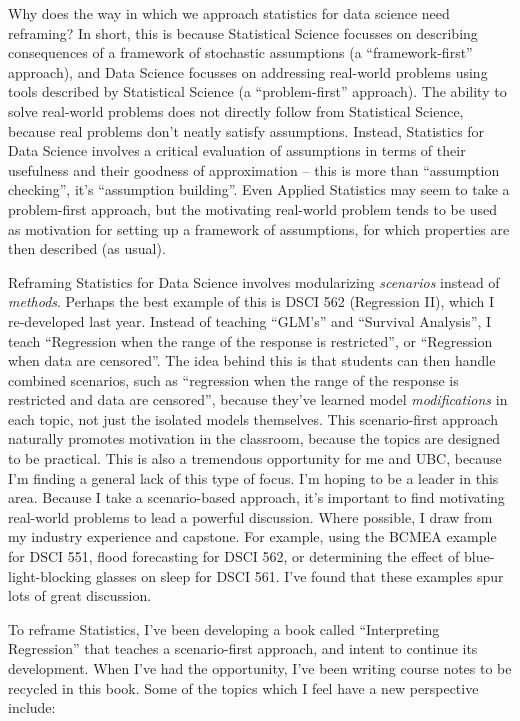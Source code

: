 \documentclass[]{article}
\begin{document}
Why does the way in which we approach statistics for data science need reframing? In short, this is because Statistical Science focusses on describing consequences of a framework of stochastic assumptions (a ``framework-first'' approach), and Data Science focusses on addressing real-world problems using tools described by Statistical Science (a ``problem-first'' approach). The ability to solve real-world problems does not directly follow from Statistical Science, because real problems don't neatly satisfy assumptions. Instead, Statistics for Data Science involves a critical evaluation of assumptions in terms of their usefulness and their goodness of approximation -- this is more than ``assumption checking'', it's ``assumption building''. Even Applied Statistics may seem to take a problem-first approach, but the motivating real-world problem tends to be used as motivation for setting up a framework of assumptions, for which properties are then described (as usual).

Reframing Statistics for Data Science involves modularizing \emph{scenarios} instead of \emph{methods}. Perhaps the best example of this is DSCI 562 (Regression II), which I re-developed last year. Instead of teaching ``GLM's'' and ``Survival Analysis'', I teach ``Regression when the range of the response is restricted'', or ``Regression when data are censored''. The idea behind this is that students can then handle combined scenarios, such as ``regression when the range of the response is restricted and data are censored'', because they've learned model \emph{modifications} in each topic, not just the isolated models themselves. This scenario-first approach naturally promotes motivation in the classroom, because the topics are designed to be practical. This is also a tremendous opportunity for me and UBC, because I'm finding a general lack of this type of focus. I'm hoping to be a leader in this area. Because I take a scenario-based approach, it's important to find motivating real-world problems to lead a powerful discussion. Where possible, I draw from my industry experience and capstone. For example, using the BCMEA example for DSCI 551, flood forecasting for DSCI 562, or determining the effect of blue-light-blocking glasses on sleep for DSCI 561. I've found that these examples spur lots of great discussion.

To reframe Statistics, I've been developing a book called ``Interpreting Regression'' that teaches a scenario-first approach, and intent to continue its development. When I've had the opportunity, I've been writing course notes to be recycled in this book. Some of the topics which I feel have a new perspective include:
\end{document}
